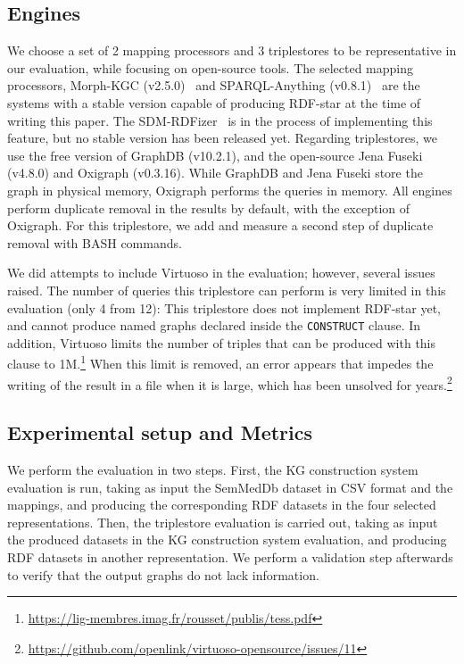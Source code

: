 \subsection{Engines}
\label{sec:chp6-1_engines}
We choose a set of 2 mapping processors and 3 triplestores to be representative in our evaluation, while focusing on open-source tools. The selected mapping processors, Morph-KGC (v2.5.0)~\parencite{arenas2022morphkgc} and SPARQL-Anything (v0.8.1)~\parencite{asprino2023sparql-anything} are the systems with a stable version capable of producing RDF-star at the time of writing this paper. The SDM-RDFizer~\parencite{iglesias2020rdfizer} is in the process of implementing this feature, but no stable version has been released yet. Regarding triplestores, we use the free version of GraphDB (v10.2.1), and the open-source Jena Fuseki (v4.8.0) and Oxigraph (v0.3.16). While GraphDB and Jena Fuseki store the graph in physical memory, Oxigraph performs the queries in memory. All engines perform duplicate removal in the results by default, with the exception of Oxigraph. For this triplestore, we add and measure a second step of duplicate removal with BASH commands.


We did attempts to include Virtuoso in the evaluation; however, several issues raised. The number of queries this triplestore can perform is very limited in this evaluation (only 4 from 12): This triplestore
does not implement RDF-star yet, and cannot produce named graphs declared inside the \texttt{CONSTRUCT} clause. In addition, Virtuoso limits the number of triples that can be produced with this clause to 1M.\footnote{\url{https://lig-membres.imag.fr/rousset/publis/tess.pdf}} When this limit is removed, an error appears that impedes the writing of the result in a file when it is large, which has been unsolved for years.\footnote{\url{https://github.com/openlink/virtuoso-opensource/issues/11}} 




\subsection{Experimental setup and Metrics}
\label{sec:chp6-1_exp-setup}
We perform the evaluation in two steps. First, the KG construction system evaluation is run, taking as input the SemMedDb dataset in CSV format and the mappings, and producing the corresponding RDF datasets in the four selected representations. Then, the triplestore evaluation is carried out, taking as input the produced datasets in the KG construction system evaluation, and producing RDF datasets in another representation. We perform a validation step afterwards to verify that the output graphs do not lack information.


